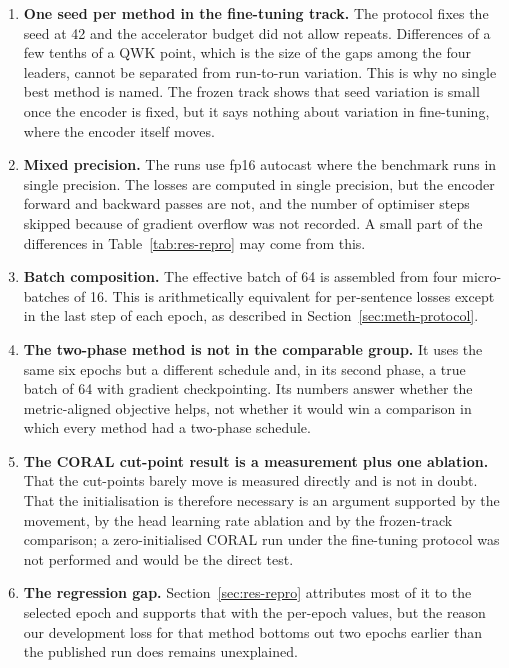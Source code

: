 \begin{enumerate}
\item \textbf{One seed per method in the fine-tuning track.} The protocol fixes the seed at 42
and the accelerator budget did not allow repeats. Differences of a few tenths of a QWK point,
which is the size of the gaps among the four leaders, cannot be separated from run-to-run
variation. This is why no single best method is named. The frozen track shows that seed
variation is small once the encoder is fixed, but it says nothing about variation in
fine-tuning, where the encoder itself moves.

\item \textbf{Mixed precision.} The runs use fp16 autocast where the benchmark runs in single
precision. The losses are computed in single precision, but the encoder forward and backward
passes are not, and the number of optimiser steps skipped because of gradient overflow was not
recorded. A small part of the differences in Table~\ref{tab:res-repro} may come from this.

\item \textbf{Batch composition.} The effective batch of 64 is assembled from four micro-batches
of 16. This is arithmetically equivalent for per-sentence losses except in the last step of each
epoch, as described in Section~\ref{sec:meth-protocol}.

\item \textbf{The two-phase method is not in the comparable group.} It uses the same six epochs
but a different schedule and, in its second phase, a true batch of 64 with gradient
checkpointing. Its numbers answer whether the metric-aligned objective helps, not whether it
would win a comparison in which every method had a two-phase schedule.

\item \textbf{The CORAL cut-point result is a measurement plus one ablation.} That the
cut-points barely move is measured directly and is not in doubt. That the initialisation is
therefore necessary is an argument supported by the movement, by the head learning rate
ablation and by the frozen-track comparison; a zero-initialised CORAL run under the fine-tuning
protocol was not performed and would be the direct test.

\item \textbf{The regression gap.} Section~\ref{sec:res-repro} attributes most of it to the
selected epoch and supports that with the per-epoch values, but the reason our development loss
for that method bottoms out two epochs earlier than the published run does remains unexplained.


\end{enumerate}
